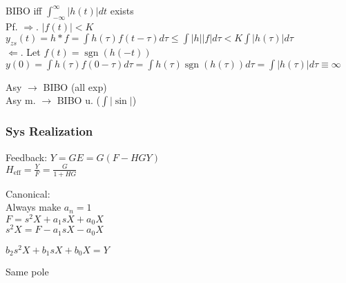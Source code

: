 \documentclass[4pt]{article}
\theoremstyle{definition}
\theoremstyle{definition}
\DeclareMathOperator{\sgn}{sgn}
\begin{document}
    BIBO iff \(\int_{-\infty}^{\infty} |h(t)| dt\) exists\\ %
    Pf. $\Rightarrow$. $|f(t)| < K$\\                       %
    \(y_{zs}(t) = h * f = \int h(\tau) f(t-\tau) d\tau \leq \int |h||f| d\tau < K \int |h(\tau)| d\tau\)\\
    $\Leftarrow$. Let $f(t) = \sgn(h(-t))$\\                %
    \(y(0) = \int h(\tau) f(0-\tau) d\tau = \int h(\tau) \sgn(h(\tau)) d\tau  = \int |h(\tau)| d\tau \equiv \infty\)

    Asy $\rightarrow$ BIBO (all exp)\\                                %
    Asy m. $\rightarrow$ BIBO u. ($\int |\sin|$)                            %

\subsubsection{Sys Realization}         %
    Feedback: \(Y = GE = G(F - HGY)\)\\
    \(H_{\text{eff}} = \frac{Y} F = \frac G {1+HG}\)

    Canonical:\\              %
    Always make $a_n = 1$\\
    \(F = s^2 X + a_1 sX + a_0 X\)\\
    \(s^2 X = F - a_1 sX - a_0 X\)      %

    \(b_2 s^2 X + b_1 sX + b_0 X = Y\)

    Same pole                           %
\end{document}
